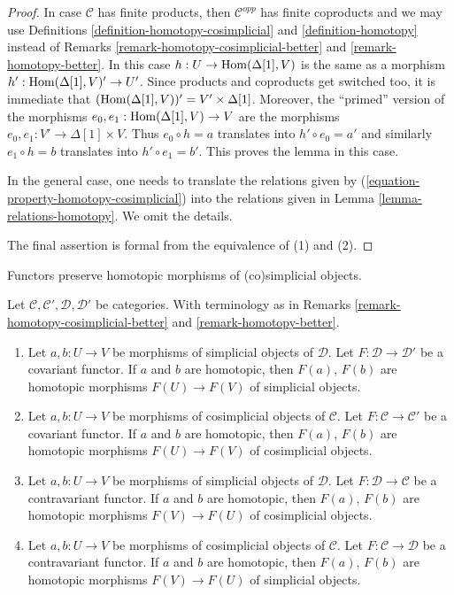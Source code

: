\begin{proof}
In case $\mathcal{C}$ has finite products, then $\mathcal{C}^{opp}$
has finite coproducts and we may use
Definitions \ref{definition-homotopy-cosimplicial}
and \ref{definition-homotopy} instead of
Remarks \ref{remark-homotopy-cosimplicial-better} and
\ref{remark-homotopy-better}.
In this case $h : U \to \mathop{\mathrm{Hom}}\nolimits(\Delta[1], V)$
is the same as a morphism $h' : \mathop{\mathrm{Hom}}\nolimits(\Delta[1], V)' \to U'$.
Since products and coproducts get switched too, it is immediate
that $(\mathop{\mathrm{Hom}}\nolimits(\Delta[1], V))' = V' \times \Delta[1]$.
Moreover, the ``primed'' version of the morphisms
$e_0, e_1 : \mathop{\mathrm{Hom}}\nolimits(\Delta[1], V) \to V$ are the morphisms
$e_0, e_1 : V' \to \Delta[1] \times V$.
Thus $e_0 \circ h = a$ translates into $h' \circ e_0 = a'$ and
similarly $e_1 \circ h = b$ translates into $h' \circ e_1 = b'$.
This proves the lemma in this case.

\medskip\noindent
In the general case, one needs to translate the relations given
by (\ref{equation-property-homotopy-cosimplicial}) into the relations
given in Lemma \ref{lemma-relations-homotopy}. We omit the details.

\medskip\noindent
The final assertion is formal from the equivalence of (1) and (2).
\end{proof}

\begin{lemma}
\label{lemma-functorial-homotopy}
\begin{slogan}
Functors preserve homotopic morphisms of (co)simplicial objects.
\end{slogan}
Let $\mathcal{C}, \mathcal{C}', \mathcal{D}, \mathcal{D}'$ be categories.
With terminology as in Remarks \ref{remark-homotopy-cosimplicial-better} and
\ref{remark-homotopy-better}.
\begin{enumerate}
\item Let $a, b : U \to V$ be morphisms of simplicial objects
of $\mathcal{D}$. Let $F : \mathcal{D} \to \mathcal{D}'$ be a covariant
functor. If $a$ and $b$ are homotopic, then $F(a)$, $F(b)$
are homotopic morphisms $F(U) \to F(V)$ of simplicial objects.
\item Let $a, b : U \to V$ be morphisms of cosimplicial objects
of $\mathcal{C}$. Let $F : \mathcal{C} \to \mathcal{C}'$ be a covariant
functor. If $a$ and $b$ are homotopic, then $F(a)$, $F(b)$
are homotopic morphisms $F(U) \to F(V)$ of cosimplicial objects.
\item Let $a, b : U \to V$ be morphisms of simplicial objects of $\mathcal{D}$.
Let $F : \mathcal{D} \to \mathcal{C}$ be a contravariant
functor. If $a$ and $b$ are homotopic, then $F(a)$, $F(b)$
are homotopic morphisms $F(V) \to F(U)$ of cosimplicial objects.
\item Let $a, b : U \to V$ be morphisms of cosimplicial objects of
$\mathcal{C}$.
Let $F : \mathcal{C} \to \mathcal{D}$ be a contravariant
functor. If $a$ and $b$ are homotopic, then $F(a)$, $F(b)$
are homotopic morphisms $F(V) \to F(U)$ of simplicial objects.
\end{enumerate}
\end{lemma}

